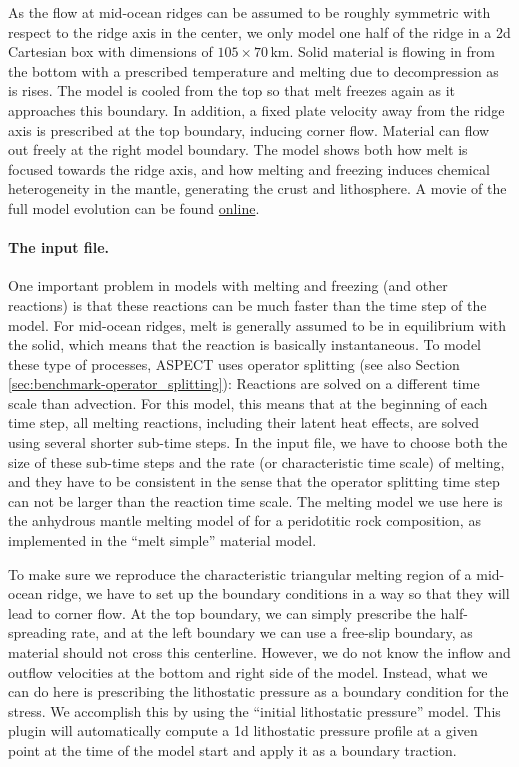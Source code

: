 \documentclass{article}
\newcommand{\aspect}{\textsc{ASPECT}}
\begin{document}
As the flow at mid-ocean ridges can be assumed to be roughly symmetric with respect to the ridge axis 
in the center, we only model one half of the ridge in a 2d Cartesian box with dimensions of $105 \times 70$\,km. Solid material is flowing in from the bottom with a prescribed temperature and melting due to decompression as is rises. The model is cooled from the top so that melt freezes again as it approaches this boundary. In addition, a fixed plate velocity away from the ridge axis is prescribed at the top boundary, inducing corner flow. Material can flow out freely at the right model boundary. The model shows both how melt is focused towards the ridge axis, and how melting and freezing induces chemical heterogeneity in the mantle, generating the crust and lithosphere. 
A movie of the full model evolution can be found \href{https://www.youtube.com/watch?v=f4Bc4lzdNP0}{online}. 

\paragraph{The input file.}
One important problem in models with melting and freezing (and other reactions) is that these reactions 
can be much faster than the time step of the model. For mid-ocean ridges, melt is generally assumed to 
be in equilibrium with the solid, which means that the reaction is basically instantaneous. 
To model these type of processes, \aspect{} uses operator splitting (see also Section \ref{sec:benchmark-operator_splitting}): Reactions are solved on a different time scale than advection. 
For this model, this means that at the beginning of each time step, all melting reactions, 
including their latent heat effects, are solved using several shorter sub-time steps. In the input file, 
we have to choose both the size of these sub-time steps and the rate (or characteristic time scale) of melting, 
and they have to be consistent in the sense that the operator splitting time step can not be larger than 
the reaction time scale. 
The melting model we use here is the anhydrous mantle melting model of \cite{KSL2003} for a peridotitic 
rock composition, as implemented in the ``melt simple'' material model. 



To make sure we reproduce the characteristic triangular melting region of a mid-ocean ridge, we have to  
set up the boundary conditions in a way so that they will lead to corner flow. At the top boundary, we can 
simply prescribe the half-spreading rate, and at the left boundary we can use a free-slip boundary, as 
material should not cross this centerline. However, we do not know the inflow and outflow velocities at 
the bottom and right side of the model. Instead, what we can do here is prescribing the lithostatic 
pressure as a boundary condition for the stress. We accomplish this by using the 
``initial lithostatic pressure'' model. This plugin will automatically compute a 1d lithostatic pressure 
profile at a given point at the time of the model start and apply it as a boundary traction.
\end{document}
